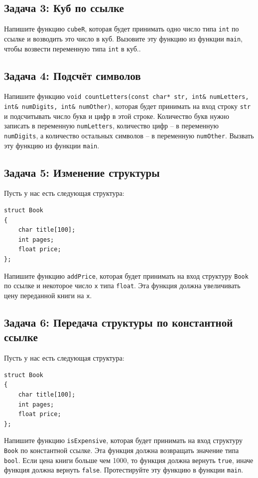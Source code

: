 \documentclass{article}
\begin{document}
\subsection*{Задача 3: Куб по ссылке}
Напишите функцию \texttt{cubeR}, которая будет принимать одно число типа \texttt{int} по ссылке и возводить это число в куб. Вызовите эту функцию из функции \texttt{main}, чтобы возвести переменную типа \texttt{int} в куб..


\subsection*{Задача 4: Подсчёт символов}
Напишите функцию \texttt{void countLetters(const char* str, int\& numLetters, int\& numDigits, int\& numOther)}, которая будет принимать на вход строку \texttt{str} и подсчитывать число букв и цифр в этой строке. Количество букв нужно записать в переменную \texttt{numLetters}, количество цифр -- в переменную \texttt{numDigits}, а количество остальных символов -- в переменную \texttt{numOther}. Вызвать эту функцию из функции \texttt{main}.


\subsection*{Задача 5: Изменение структуры}
Пусть у нас есть следующая структура:
\begin{lstlisting}
struct Book
{
    char title[100];
    int pages;
    float price;
};
\end{lstlisting}

Напишите функцию \texttt{addPrice}, которая будет принимать на вход структуру \texttt{Book} по ссылке и некоторое число \texttt{x} типа \texttt{float}. Эта функция должна увеличивать цену переданной книги на \texttt{x}.


\subsection*{Задача 6: Передача структуры по константной ссылке}
Пусть у нас есть следующая структура:
\begin{lstlisting}
struct Book
{
    char title[100];
    int pages;
    float price;
};
\end{lstlisting}

Напишите функцию \texttt{isExpensive}, которая будет принимать на вход структуру \texttt{Book} по константной ссылке. Эта функция должна возвращать значение типа \texttt{bool}. Если цена книги больше чем 1000, то функция должна вернуть \texttt{true}, иначе функция должна вернуть \texttt{false}. Протестируйте эту функцию в функции \texttt{main}.
\end{document}
